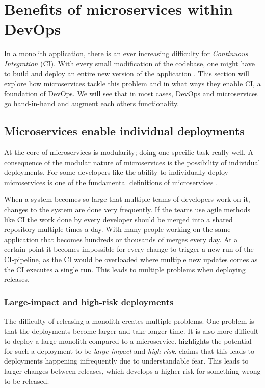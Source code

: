 \documentclass{article}
\begin{document}
\section{Benefits of microservices within DevOps}
In a monolith application, there is an ever increasing difficulty for \textit{Continuous Integration} (CI). With every small modification of the codebase, one might have to build and deploy an entire new version of the application \cite{Jeremiah}. This section will explore how microservices tackle this problem and in what ways they enable CI, a foundation of DevOps. We will see that in most cases, DevOps and microservices go hand-in-hand and augment each others functionality.

\subsection{Microservices enable individual deployments}
At the core of microservices is modularity; doing one specific task really well. A consequence of the modular nature of microservices is the possibility of individual deployments. For some developers like \citeauthor{Newman2015} the ability to individually deploy microservices is one of the fundamental definitions of microservices \cite{Newman2015}.

When a system becomes so large that multiple teams of developers work on it, changes to the system are done very frequently. If the teams use agile methods like CI the work done by every developer should be merged into a shared repository multiple times a day. With many people working on the same application that becomes hundreds or thousands of merges every day. At a certain point it becomes impossible for every change to trigger a new run of the CI-pipeline, as the CI would be overloaded where multiple new updates comes as the CI executes a single run. This leads to multiple problems when deploying releases.

\subsubsection{Large-impact and high-risk deployments}
The difficulty of releasing a monolith creates multiple problems. One problem is that the deployments become larger and take longer time. It is also more difficult to deploy a large monolith compared to a microservice. \citeauthor{Newman2015} highlights the potential for such a deployment to be \textit{large-impact} and \textit{high-risk}. \citeauthor{Newman2015} claims that this leads to deployments happening infrequently due to understandable fear. This leads to larger changes between releases, which develops a higher risk for something wrong to be released. \cite[p.~6]{Newman2015}
\end{document}
